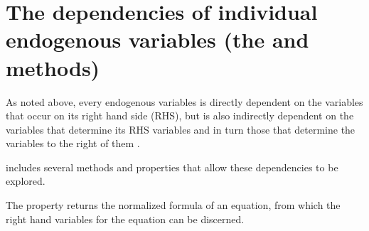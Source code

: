 \documentclass[letterpaper,10pt,english]{jupyterBook}
\begin{document}
\chapter{The dependencies of individual endogenous variables (the   and methods)}
\label{\detokenize{content/06_ModelAnalytics/ModelStructure:the-dependencies-of-individual-endogenous-variables-the-tracepre-and-tracedep-methods}}
\sphinxAtStartPar
As noted above, every endogenous variables is directly dependent on the variables that occur on its right hand side (RHS), but is also indirectly dependent on the variables that determine its RHS variables and in turn those that determine the variables to the right of them .

\sphinxAtStartPar
{} includes several methods and properties that allow these dependencies to be explored.

\sphinxAtStartPar
The  property returns the normalized formula of an equation, from which the right hand variables for the equation can be discerned.
\end{document}
